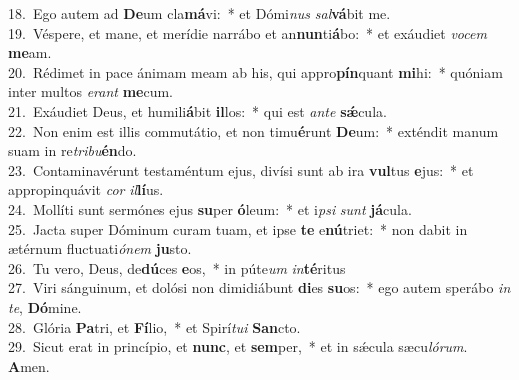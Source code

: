 {18.~}Ego autem ad \textbf{De}um cla\textbf{má}vi:~* et Dómi\textit{nus} \textit{sal}\textbf{vá}bit me.\\
{19.~}Véspere, et mane, et merídie narrábo et an\textbf{nun}ti\textbf{á}bo:~* et exáudiet \textit{vo}\textit{cem} \textbf{me}am.\\
{20.~}Rédimet in pace ánimam meam ab his, qui appro\textbf{pín}quant \textbf{mi}hi:~* quóniam inter multos \textit{e}\textit{rant} \textbf{me}cum.\\
{21.~}Exáudiet Deus, et humili\textbf{á}bit \textbf{il}los:~* qui est \textit{an}\textit{te} \textbf{sǽ}cula.\\
{22.~}Non enim est illis commutátio, et non timu\textbf{é}runt \textbf{De}um:~* exténdit manum suam in re\textit{tri}\textit{bu}\textbf{én}do.\\
{23.~}Contaminavérunt testaméntum ejus, divísi sunt ab ira \textbf{vul}tus \textbf{e}jus:~* et appropinquávit \textit{cor} \textit{il}\textbf{lí}us.\\
{24.~}Mollíti sunt sermónes ejus \textbf{su}per \textbf{ó}leum:~* et i\textit{psi} \textit{sunt} \textbf{já}cula.\\
{25.~}Jacta super Dóminum curam tuam, et ipse \textbf{te} e\textbf{nú}triet:~* non dabit in ætérnum fluctuati\textit{ó}\textit{nem} \textbf{ju}sto.\\
{26.~}Tu vero, Deus, de\textbf{dú}ces \textbf{e}os,~* in púte\textit{um} \textit{in}\textbf{té}ritus\\
{27.~}Viri sánguinum, et dolósi non dimidiábunt \textbf{di}es \textbf{su}os:~* ego autem sperábo \textit{in} \textit{te}, \textbf{Dó}mine.\\
{28.~}Glória \textbf{Pa}tri, et \textbf{Fí}lio,~* et Spirí\textit{tu}\textit{i} \textbf{San}cto.\\
{29.~}Sicut erat in princípio, et \textbf{nunc}, et \textbf{sem}per,~* et in sǽcula sæcu\textit{ló}\textit{rum}. \textbf{A}men.\\
